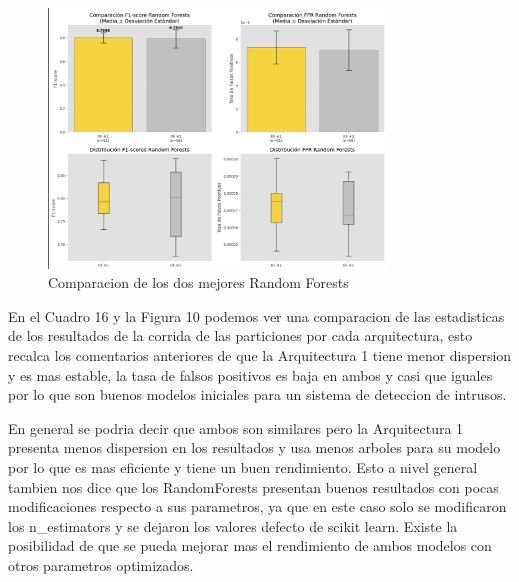 \documentclass[12pt,a4paper]{article}
\begin{document}
\begin{figure}[H]
  \centering
  \includegraphics[width=0.8\textwidth]{../img/ComparacionRandomForest.png}
  \caption{Comparacion de los dos mejores Random Forests}\label{fig:comparison-random-forest}
\end{figure}

En el Cuadro 16 y la Figura 10 podemos ver una comparacion de las estadisticas de los resultados de la corrida
de las particiones por cada arquitectura, esto recalca los comentarios anteriores de que la Arquitectura 1 tiene menor
dispersion y es mas estable, la tasa de falsos positivos es baja en ambos y casi que iguales por lo que
son buenos modelos iniciales para un sistema de deteccion de intrusos.

En general se podria decir que ambos son similares pero la Arquitectura 1 presenta menos dispersion en los resultados
y usa menos arboles para su modelo por lo que es mas eficiente y tiene un buen rendimiento. Esto a nivel general
tambien nos dice que los RandomForests presentan buenos resultados con pocas modificaciones respecto a sus parametros,
ya que en este caso solo se modificaron los n_estimators y se dejaron los valores defecto de scikit learn.
Existe la posibilidad de que se pueda mejorar mas el rendimiento de ambos modelos con otros parametros optimizados.
\end{document}
